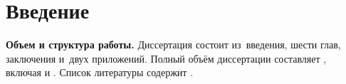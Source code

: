 \chapter*{Введение}                         %

\newcommand{\actuality}{}
\newcommand{\progress}{}
\newcommand{\aim}{{\textbf\aimTXT}}
\newcommand{\tasks}{\textbf{\tasksTXT}}
\newcommand{\novelty}{\textbf{\noveltyTXT}}
\newcommand{\influence}{\textbf{\influenceTXT}}
\newcommand{\methods}{\textbf{\methodsTXT}}
\newcommand{\defpositions}{\textbf{\defpositionsTXT}}
\newcommand{\reliability}{\textbf{\reliabilityTXT}}
\newcommand{\probation}{\textbf{\probationTXT}}
\newcommand{\contribution}{\textbf{\contributionTXT}}
\newcommand{\publications}{\textbf{\publicationsTXT}}


\textbf{Объем и структура работы.} Диссертация состоит из~введения, шести глав, заключения и~двух приложений.
%
Полный объём диссертации составляет
, включая
 и
.   Список литературы содержит  
.
